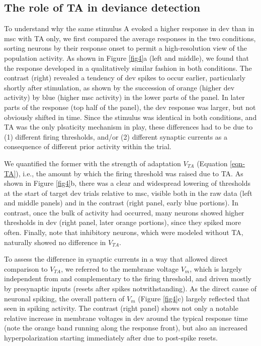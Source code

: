 \documentclass[pdflatex,referee,iicol,sn-basic]{sn-jnl}
\theoremstyle{thmstyleone}%
\theoremstyle{thmstyletwo}%
\theoremstyle{thmstylethree}%
\begin{document}
\subsection{The role of TA in deviance detection}\label{sec-ta}

To understand why the same stimulus A evoked a higher response in dev than in msc with TA only, we first compared the average responses in the two conditions, sorting neurons by their response onset to permit a high-resolution view of the population activity. As shown in Figure \ref{fig4}a (left and middle), we found that the response developed in a qualitatively similar fashion in both conditions. The contrast (right) revealed a tendency of dev spikes to occur earlier, particularly shortly after stimulation, as shown by the succession of orange (higher dev activity) by blue (higher msc activity) in the lower parts of the panel. In later parts of the response (top half of the panel), the dev response was larger, but not obviously shifted in time. Since the stimulus was identical in both conditions, and TA was the only plsaticity mechanism in play, these differences had to be due to (1) different firing thresholds, and/or (2) different synaptic currents as a consequence of different prior activity within the trial.

We quantified the former with the strength of adaptation $V_{TA}$ (Equation \ref{eqn-TA}), i.e., the amount by which the firing threshold was raised due to TA. As shown in Figure \ref{fig4}b, there was a clear and widespread lowering of thresholds at the start of target dev trials relative to msc, visible both in the raw data (left and middle panels) and in the contrast (right panel, early blue portions). In contrast, once the bulk of activity had occurred, many neurons showed higher thresholds in dev (right panel, later orange portions), since they spiked more often. Finally, note that inhibitory neurons, which were modeled without TA, naturally showed no difference in $V_{TA}$.

To assess the difference in synaptic currents in a way that allowed direct comparison to $V_{TA}$, we referred to the membrane voltage $V_m$, which is largely independent from and complementary to the firing threshold, and driven mostly by presynaptic inputs (resets after spikes notwithstanding). As the direct cause of neuronal spiking, the overall pattern of $V_m$ (Figure \ref{fig4}c) largely reflected that seen in spiking activity. The contrast (right panel) shows not only a notable relative increase in membrane voltages in dev around the typical response time (note the orange band running along the response front), but also an increased hyperpolarization starting immediately after due to post-spike resets.
\end{document}

